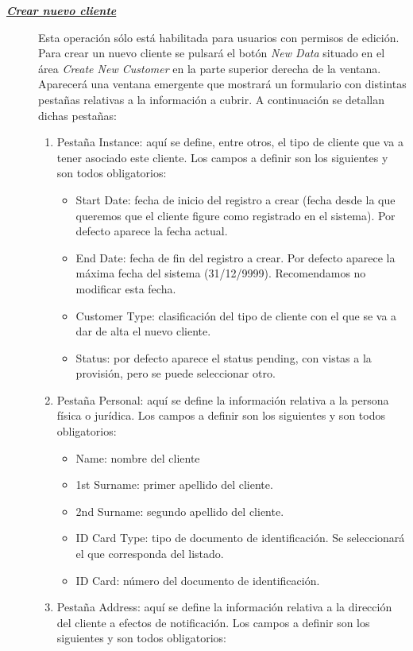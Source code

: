 \begin{description}
\item[\underline{\textsl{\textbf{Crear nuevo cliente}}}] Esta operación sólo está habilitada para usuarios con permisos de edición.
Para crear un nuevo cliente se pulsará el botón \textit{New Data} situado en el área \emph{Create New Customer} en la parte superior derecha de la ventana. Aparecerá una ventana emergente que mostrará un formulario con distintas pestañas relativas a la información a cubrir. A continuación se detallan dichas pestañas:
\begin{enumerate}
\item Pestaña Instance: aquí se define, entre otros, el tipo de cliente que va a tener asociado este cliente. Los campos a definir son los siguientes y son todos obligatorios:
	\begin{itemize}
	\item Start Date: fecha de inicio del registro a crear (fecha desde la que queremos que el cliente figure como registrado en el sistema). Por defecto aparece la fecha actual.
	\item End Date: fecha de fin del registro a crear. Por defecto aparece la máxima fecha del sistema (31/12/9999). Recomendamos no modificar esta fecha.
	\item Customer Type: clasificación del tipo de cliente con el que se va a dar de alta el nuevo cliente.
	\item Status: por defecto aparece el status pending, con vistas a la provisión, pero se puede seleccionar otro.
	\end{itemize}
\item Pestaña Personal: aquí se define la información relativa a la persona física o jurídica. Los campos a definir son los siguientes y son todos obligatorios:
	\begin{itemize}
	\item Name: nombre del cliente
	\item 1st Surname: primer apellido del cliente.
	\item 2nd Surname: segundo apellido del cliente.
	\item ID Card Type: tipo de documento de identificación. Se seleccionará el que corresponda del listado.
	\item ID Card: número del documento de identificación.
	\end{itemize}
\item Pestaña Address: aquí se define la información relativa a la dirección del cliente a efectos de notificación. Los campos a definir son los siguientes y son todos obligatorios:

\end{enumerate}
\end{description}
